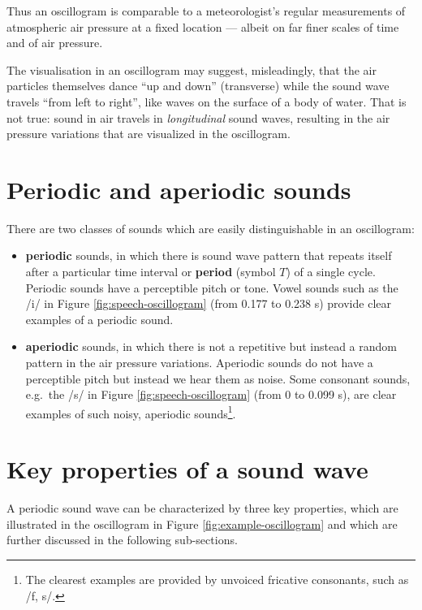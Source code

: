 \documentclass[
]{book}
\begin{document}
Thus an oscillogram is comparable to a meteorologist's regular measurements of atmospheric air pressure at a fixed location --- albeit on far finer scales of time and of air pressure.

The visualisation in an oscillogram may suggest, misleadingly, that the air particles themselves dance ``up and down'' (transverse) while the sound wave travels ``from left to right'', like waves on the surface of a body of water. That is not true: sound in air travels in \emph{longitudinal} sound waves, resulting in the air pressure variations that are visualized in the oscillogram.

\section{Periodic and aperiodic sounds}\label{sec:periodicity}

There are two classes of sounds which are easily distinguishable in an oscillogram:

\begin{itemize}
\item
  \textbf{periodic} sounds, in which there is sound wave pattern that repeats itself after a particular time interval or \textbf{period} (symbol \(T\)) of a single cycle. Periodic sounds have a perceptible pitch or tone. Vowel sounds such as the /i/ in Figure \ref{fig:speech-oscillogram} (from 0.177 to 0.238 s) provide clear examples of a periodic sound.
\item
  \textbf{aperiodic} sounds, in which there is not a repetitive but instead a random pattern in the air pressure variations. Aperiodic sounds do not have a perceptible pitch but instead we hear them as noise. Some consonant sounds, e.g.~the /s/ in Figure \ref{fig:speech-oscillogram} (from 0 to 0.099 s), are clear examples of such noisy, aperiodic sounds\footnote{The clearest examples are provided by unvoiced fricative consonants, such as /f, s/.}.
\end{itemize}

\section{Key properties of a sound wave}\label{sec:keypropertiessound}

A periodic sound wave can be characterized by three key properties, which are illustrated in the oscillogram in Figure \ref{fig:example-oscillogram} and which are further discussed in the following sub-sections.
\end{document}
